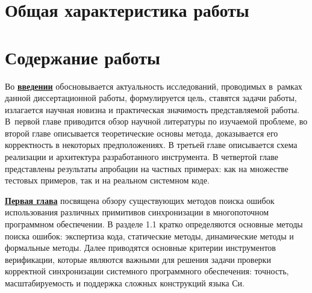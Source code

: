 
\section*{Общая характеристика работы}

\newcommand{\actuality}{\underline{\textbf{\actualityTXT}}}
\newcommand{\progress}{\underline{\textbf{\progressTXT}}}
\newcommand{\aim}{\underline{{\textbf\aimTXT}}}
\newcommand{\tasks}{\underline{\textbf{\tasksTXT}}}
\newcommand{\novelty}{\underline{\textbf{\noveltyTXT}}}
\newcommand{\influence}{\underline{\textbf{\influenceTXT}}}
\newcommand{\methods}{\underline{\textbf{\methodsTXT}}}
\newcommand{\defpositions}{\underline{\textbf{\defpositionsTXT}}}
\newcommand{\reliability}{\underline{\textbf{\reliabilityTXT}}}
\newcommand{\probation}{\underline{\textbf{\probationTXT}}}
\newcommand{\contribution}{\underline{\textbf{\contributionTXT}}}
\newcommand{\publications}{\underline{\textbf{\publicationsTXT}}}



\section*{Содержание работы}
Во \underline{\textbf{введении}} обосновывается актуальность
исследований, проводимых в~рамках данной диссертационной работы,
формулируется цель, ставятся задачи работы, излагается научная новизна
и практическая значимость представляемой работы.
В~первой главе приводится обзор научной литературы по изучаемой проблеме, во второй главе описывается теоретические основы метода, доказывается его корректность в некоторых предположениях.
В третьей главе описывается схема реализации и архитектура разработанного инструмента.
В четвертой главе представлены результаты апробации на частных примерах: как на множестве тестовых примеров, так и на реальном системном коде.

\underline{\textbf{Первая глава}} посвящена обзору существующих методов поиска ошибок использования различных примитивов синхронизации в многопоточном программном обеспечении.
В разделе 1.1 кратко определяются основные методы поиска ошибок: экспертиза кода, статические методы, динамические методы и формальные методы.
Далее приводятся основные критерии инструментов верификации, которые являются важными для решения задачи проверки корректной синхронизации системного программного обеспечения: точность, масштабируемость и поддержка сложных конструкций языка Си.


